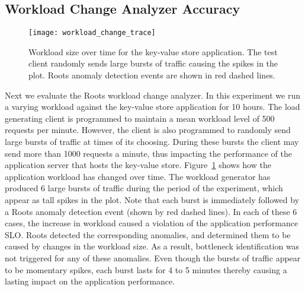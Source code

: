 \subsection{Workload Change Analyzer Accuracy}
\begin{figure}
\centering
\texttt{[image: workload\_change\_trace]}
\caption{Workload size over time for the key-value store application. The test client randomly sends
large bursts of traffic causing the spikes in the plot. Roots anomaly detection events are shown
in red dashed lines.}
\label{fig:workload_change}
\end{figure}

Next we evaluate the Roots workload change analyzer. In this experiment we run a varying workload
against the key-value store application for 10 hours. The load generating client is programmed
to maintain a mean workload level of 500 requests per minute. However, the client
is also programmed to randomly send large bursts of traffic at times of its choosing. During these bursts 
the client may send more than 1000 requests a minute, thus impacting the performance of
the application server that hosts the key-value store. Figure~\ref{fig:workload_change} shows how
the application workload has changed over time. The workload generator has produced 6 large bursts of traffic during the 
period of the experiment, which appear as tall spikes in the plot.
Note that each burst is immediately followed by a Roots anomaly detection event (shown by red dashed lines). 
In each of these 6 cases, the increase in workload caused a violation of the application performance SLO.
Roots detected the corresponding anomalies, and determined them to be caused by changes in the workload size.
As a result, bottleneck identification was not triggered for any of these anomalies.
Even though the bursts of traffic appear to be momentary
spikes, each burst lasts for 4 to 5 minutes thereby causing a lasting impact on the application performance.


